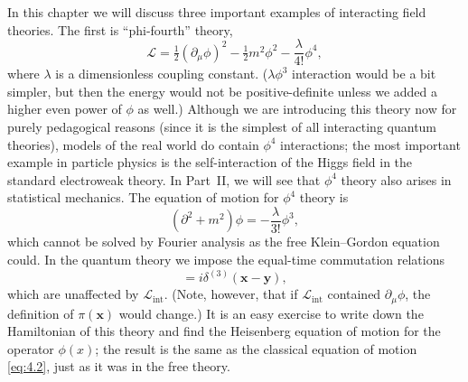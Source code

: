 In this chapter we will discuss three important examples of interacting
field theories.  The first is ``phi-fourth'' theory,
\begin{equation}
  \mathcal{L} = \tfrac{1}{2}(\partial_\mu\phi)^2 - \tfrac{1}{2}m^2\phi^2
    - \frac{\lambda}{4!}\phi^4 ,
  \label{eq:4.1}
\end{equation}
where $\lambda$ is a dimensionless coupling constant.  ($\lambda\phi^3$
interaction would be a bit simpler, but then the energy would not be
positive-definite unless we added a higher even power of $\phi$ as well.)
Although we are introducing this theory now for purely pedagogical reasons
(since it is the simplest of all interacting quantum theories), models of the
real world do contain $\phi^4$ interactions; the most important example in
particle physics is the self-interaction of the Higgs field in the standard
electroweak theory.  In Part~II, we will see that $\phi^4$ theory also arises
in statistical mechanics.  The equation of motion for $\phi^4$ theory is
\begin{equation}
  (\partial^2 + m^2)\phi = -\frac{\lambda}{3!}\phi^3,
  \label{eq:4.2}
\end{equation}
which cannot be solved by Fourier analysis as the free Klein--Gordon
equation could.  In the quantum theory we impose the equal-time commutation
relations
\begin{equation}
  [\phi(\mathbf{x}), \pi(\mathbf{y})] = i\delta^{(3)}(\mathbf{x}-\mathbf{y}),
\end{equation}
which are unaffected by $\mathcal{L}_{\mathrm{int}}$.  (Note, however, that
if $\mathcal{L}_{\mathrm{int}}$ contained $\partial_\mu\phi$, the definition
of $\pi(\mathbf{x})$ would change.)  It is an easy exercise to write down the
Hamiltonian of this theory and find the Heisenberg equation of motion for
the operator $\phi(x)$; the result is the same as the classical equation of
motion \eqref{eq:4.2}, just as it was in the free theory.

